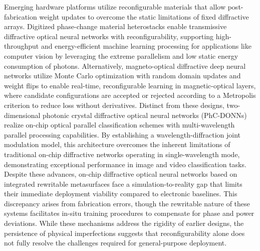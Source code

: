 \documentclass[11pt]{article}
\begin{document}
Emerging hardware platforms utilize reconfigurable materials that allow post-fabrication weight updates to overcome the static limitations of fixed diffractive arrays. Digitized phase-change material heterostacks enable transmissive diffractive optical neural networks with reconfigurability, supporting high-throughput and energy-efficient machine learning processing for applications like computer vision by leveraging the extreme parallelism and low static energy consumption of photons. Alternatively, magneto-optical diffractive deep neural networks utilize Monte Carlo optimization with random domain updates and weight flips to enable real-time, reconfigurable learning in magnetic-optical layers, where candidate configurations are accepted or rejected according to a Metropolis criterion to reduce loss without derivatives. Distinct from these designs, two-dimensional photonic crystal diffractive optical neural networks (PhC-DONNs) realize on-chip optical parallel classification schemes with multi-wavelength parallel processing capabilities. By establishing a wavelength-diffraction joint modulation model, this architecture overcomes the inherent limitations of traditional on-chip diffractive networks operating in single-wavelength mode, demonstrating exceptional performance in image and video classification tasks. Despite these advances, on-chip diffractive optical neural networks based on integrated rewritable metasurfaces face a simulation-to-reality gap that limits their immediate deployment viability compared to electronic baselines. This discrepancy arises from fabrication errors, though the rewritable nature of these systems facilitates in-situ training procedures to compensate for phase and power deviations. While these mechanisms address the rigidity of earlier designs, the persistence of physical imperfections suggests that reconfigurability alone does not fully resolve the challenges required for general-purpose deployment. \citep{doi_10_1002_adpr_202400201_566e9e2f} \citep{doi_10_1051_jeos_2026026_1bd8ff13} \citep{doi_10_1038_s41598_025_19638_8_1b2db1c9} \citep{doi_10_1515_nanoph_2025_0168_86a0f7aa}
\end{document}
